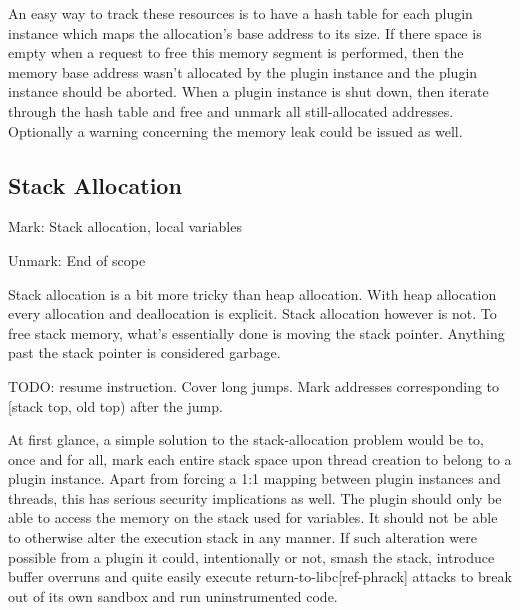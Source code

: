 An easy way to track these resources is to have a hash table for each plugin
instance which maps the allocation's base address to its size. If there space is
empty when a request to free this memory segment is performed, then the memory
base address wasn't allocated by the plugin instance and the plugin instance
should be aborted. When a plugin instance is shut down, then iterate through
the hash table and free and unmark all still-allocated addresses. Optionally a
warning concerning the memory leak could be issued as well.

\subsection {Stack Allocation}

Mark: Stack allocation, local variables

Unmark: End of scope

Stack allocation is a bit more tricky than heap allocation. With heap allocation
every allocation and deallocation is explicit. Stack allocation however is not.
To free stack memory, what's essentially done is moving the stack pointer.
Anything past the stack pointer is considered garbage.

TODO: resume instruction. Cover long jumps. Mark addresses corresponding to
[stack top, old top) after the jump.

At first glance, a simple solution to the stack-allocation problem would be to,
once and for all, mark each entire stack space upon thread creation to belong to
a plugin instance. Apart from forcing a 1:1 mapping between plugin instances and
threads, this has serious security implications as well. The plugin should only
be able to access the memory on the stack used for variables. It should not be
able to otherwise alter the execution stack in any manner. If such alteration
were possible from a plugin it could, intentionally or not, smash the stack,
introduce buffer overruns and quite easily execute return-to-libc[ref-phrack]
attacks to break out of its own sandbox and run uninstrumented code.


